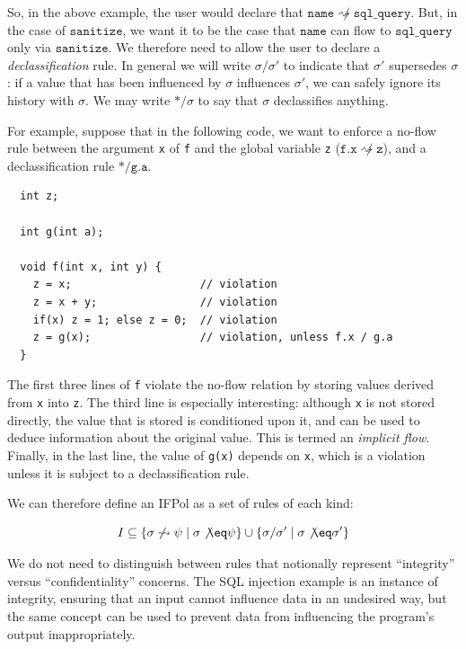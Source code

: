 \documentclass[acmsmall,review,anonymous]{acmart}\settopmatter{printfolios=true,printccs=false,printacmref=false}
\begin{document}
So, in the above example, the user would declare that \(\mathtt{name} \not \rightsquigarrow \mathtt{sql\_query}\).
But, in the case of \(\mathtt{sanitize}\), we want it to be the case that \(\mathtt{name}\) can flow to
\(\mathtt{sql\_query}\) only via \(\mathtt{sanitize}\). We therefore need to allow the user to declare
a {\em declassification} rule. In general we will write \(\sigma / \sigma'\) to indicate that \(\sigma'\)
supersedes \(\sigma\): if a value that has been influenced by \(\sigma\) influences \(\sigma'\), we
can safely ignore its history with \(\sigma\). We may write \(* / \sigma\) to say that \(\sigma\)
declassifies anything.

For example, suppose that in the following code, we want to enforce a no-flow rule between
the argument {\tt x} of {\tt f} and the global variable {\tt z}
(\(\mathtt{f.x} \not \rightsquigarrow \mathtt{z}\)), and a declassification rule
\(* / \mathtt{g.a}\).

\begin{verbatim}
  int z;

  int g(int a);

  void f(int x, int y) {
    z = x;                    // violation
    z = x + y;                // violation
    if(x) z = 1; else z = 0;  // violation
    z = g(x);                 // violation, unless f.x / g.a
  }
\end{verbatim}

The first three lines of {\tt f} violate the no-flow relation by storing values derived from
{\tt x} into {\tt z}. The third line is especially interesting: although {\tt x} is not stored
directly, the value that is stored is conditioned upon it, and can be used to deduce information
about the original value. This is termed an {\em implicit flow}. Finally, in the last line,
the value of {\tt g(x)} depends on {\tt x}, which is a violation unless it is subject to a
declassification rule.

We can therefore define an IFPol as a set of rules of each kind:

\[I \subseteq \{\sigma \not \rightsquigarrow \psi \mid \sigma \not \eq \psi\} \cup
\{\sigma / \sigma' \mid \sigma \not \eq \sigma'\}\]

We do not need to distinguish between rules that notionally represent ``integrity'' versus ``confidentiality''
concerns. The SQL injection example is an instance of integrity, ensuring that an input cannot influence data
in an undesired way, but the same concept can be used to prevent data from influencing the program's output
inappropriately.
\end{document}
